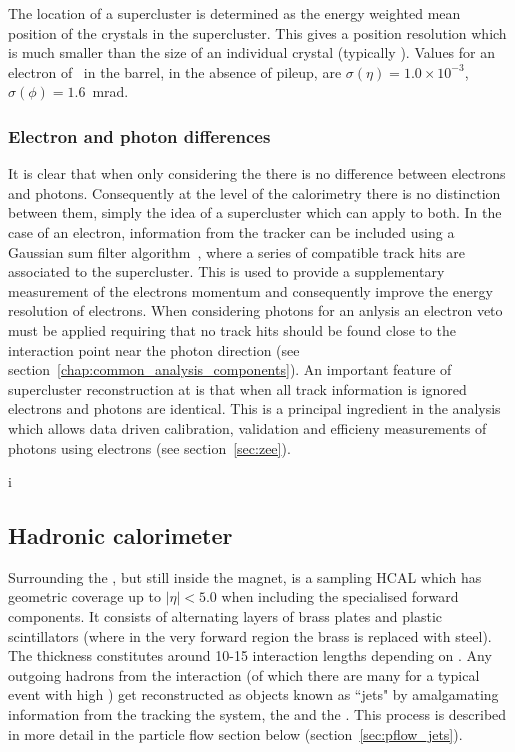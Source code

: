 The location of a supercluster is determined as the energy weighted mean position of the crystals in the supercluster. This gives a position resolution which is much smaller than the size of an individual crystal (typically ). Values for an electron of ~\GeV in the \ECAL barrel, in the absence of pileup, are $\sigma(\eta)=1.0\times10^{-3}$, $\sigma(\phi)=1.6$~mrad.

\subsubsection{Electron and photon differences}

It is clear that when only considering the \ECAL there is no difference between electrons and photons. Consequently at the level of the calorimetry there is no distinction between them, simply the idea of a supercluster which can apply to both. In the case of an electron, information from the tracker can be included using a Gaussian sum filter algorithm~\cite{tracker_electron_reco}, where a series of compatible track hits are associated to the supercluster. This is used to provide a supplementary measurement of the electrons momentum and consequently improve the energy resolution of electrons. When considering photons for an anlysis an electron veto must be applied requiring that no track hits should be found close to the interaction point near the photon direction (see section~\ref{chap:common_analysis_components}). An important feature of supercluster reconstruction at \CMS is that when all track information is ignored electrons and photons are identical. This is a principal ingredient in the \Hgg analysis which allows data driven calibration, validation and efficieny measurements of photons using electrons (see section~\ref{sec:zee}).

i\subsection{Hadronic calorimeter}
\label{sec:hcal}

Surrounding the \ECAL, but still inside the magnet, is a sampling \acf{HCAL} which has geometric coverage up to $|\eta|<5.0$ when including the specialised forward components. It consists of alternating layers of brass plates and plastic scintillators (where in the very forward region the brass is replaced with steel). The \HCAL thickness constitutes around 10-15 interaction lengths depending on \eta. Any outgoing hadrons from the interaction (of which there are many for a typical event with high \ET) get reconstructed as objects known as ``jets" by amalgamating information from the tracking the system, the \ECAL and the \HCAL. This process is described in more detail in the particle flow section below (section~\ref{sec:pflow_jets}).  

